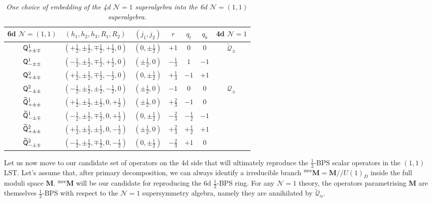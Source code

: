 \documentclass[main.tex]{subfiles}
\begin{document}
\begin{table}
\centering
\begin{tabular}{|c|c|c|c|c|c|c|} 
\hline
 6d $\mathcal{N}=(1,1)$&  $(h_1,h_2,h_3,R_1,R_2)$ & $(j_1,j_2)$ & $r$ &$q_t$&$q_b$& 4d $\mathcal{N}=1$\\ 
 \hline\hline
 $\mathsf{Q}^{1}_{+\pm\mp}$&$(+\frac{1}{2},\pm\frac{1}{2},\mp\frac{1}{2},+\frac{1}{2},0)$&$(0,\pm\frac{1}{2})$&$+1$&$0$&$0$&$\widetilde{\mathcal{Q}}_{\dot\pm}$\\\hline
   $\mathsf{Q}^{1}_{-\pm\pm}$&$(-\frac{1}{2},\pm\frac{1}{2},\mp\frac{1}{2},+\frac{1}{2},0)$&$(\pm\frac{1}{2},0)$&$-\frac{1}{3}$&$1$&$-1$&\\\hline
 $\mathsf{Q}^{2}_{+\pm\mp}$&$(+\frac{1}{2},\pm\frac{1}{2},\mp\frac{1}{2},-\frac{1}{2},0)$&$(0,\pm\frac{1}{2})$&$+\frac{1}{3}$&$-1$&$+1$&\\\hline
    $\mathsf{Q}^{2}_{-\pm\pm}$&$(-\frac{1}{2},\pm\frac{1}{2},\pm\frac{1}{2},-\frac{1}{2},0)$&$(\pm\frac{1}{2},0)$&$-1$&$0$&$0$&$\mathcal{Q}_{\pm}$\\\hline
$\widetilde{\mathsf{Q}}^{\dot1}_{+\pm\pm}$&$(+\frac{1}{2},\pm\frac{1}{2},\pm\frac{1}{2},0,+\frac{1}{2})$&$(\pm\frac{1}{2},0)$&$+\frac{2}{3}$&$-1$&$0$&\\\hline
$\widetilde{\mathsf{Q}}^{\dot1}_{-\pm\mp}$&$(-\frac{1}{2},\pm\frac{1}{2},\mp\frac{1}{2},0,+\frac{1}{2})$&$(0,\pm\frac{1}{2})$&$-\frac{2}{3}$&$-\frac{1}{2}$&$-1$&\\\hline
$\widetilde{\mathsf{Q}}^{\dot2}_{+\pm\pm}$&$(+\frac{1}{2},\pm\frac{1}{2},\pm\frac{1}{2},0,-\frac{1}{2})$&$(\pm\frac{1}{2},0)$&$+\frac{2}{3}$&$+\frac{1}{2}$&$+1$&\\\hline
$\widetilde{\mathsf{Q}}^{\dot2}_{-\pm\mp}$&$(-\frac{1}{2},\pm\frac{1}{2},\mp\frac{1}{2},0,-\frac{1}{2})$&$(0,\pm\frac{1}{2})$&$-\frac{2}{3}$&$+1$&$0$&\\\hline
\end{tabular}
\caption{\textit{One choice of embedding of the 4d $\mathcal{N}=1$ superalgebra into the 6d $\mathcal{N}=(1,1)$ superalgebra.}}
\label{tab:6d4dembedding}
\end{table}

Let us now move to our candidate set of operators on the 4d side that will ultimately reproduce the $\frac{1}{2}$-BPS scalar operators in the $(1,1)$ LST.
Let's assume that, after primary decomposition, we can always identify a irreducible branch ${}^{\text{mes}}\mathbf{M}=\mathbf{M}//U(1)_D$ inside the full moduli space $\mathbf{M}$. ${}^{\text{mes}}\mathbf{M}$ will be our candidate for reproducing the 6d $\frac{1}{2}$-BPS ring. For any $\mathcal{N}=1$ theory, the operators parametrising $\mathbf{M}$ are themselves $\frac{1}{2}$-BPS with respect to the $\mathcal{N}=1$ supersymmetry algebra, namely they are annihilated by $\widetilde{\mathcal{Q}}_{\dot\alpha}$. 
\end{document}
